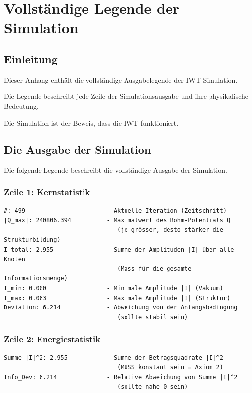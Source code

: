 \chapter{Vollständige Legende der Simulation}

\section{Einleitung}

Dieser Anhang enthält die vollständige Ausgabelegende der IWT-Simulation.

Die Legende beschreibt jede Zeile der Simulationsausgabe und ihre physikalische Bedeutung.

Die Simulation ist der Beweis, dass die IWT funktioniert.

\section{Die Ausgabe der Simulation}

Die folgende Legende beschreibt die vollständige Ausgabe der Simulation.

\subsection{Zeile 1: Kernstatistik}

\begin{verbatim}
#: 499                       - Aktuelle Iteration (Zeitschritt)
|Q_max|: 240806.394          - Maximalwert des Bohm-Potentials Q
                                (je grösser, desto stärker die Strukturbildung)
I_total: 2.955               - Summe der Amplituden |I| über alle Knoten
                                (Mass für die gesamte Informationsmenge)
I_min: 0.000                 - Minimale Amplitude |I| (Vakuum)
I_max: 0.063                 - Maximale Amplitude |I| (Struktur)
Deviation: 6.214             - Abweichung von der Anfangsbedingung
                                (sollte stabil sein)
\end{verbatim}

\subsection{Zeile 2: Energiestatistik}

\begin{verbatim}
Summe |I|^2: 2.955           - Summe der Betragsquadrate |I|^2
                                (MUSS konstant sein = Axiom 2)
Info_Dev: 6.214              - Relative Abweichung von Summe |I|^2
                                (sollte nahe 0 sein)
\end{verbatim}

